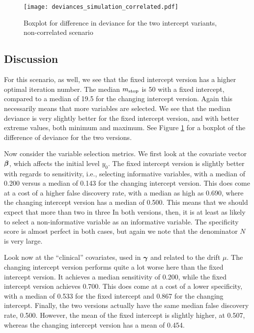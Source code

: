 \begin{figure}
\caption{Boxplot for difference in deviance for the two intercept variants, non-correlated scenario}
\label{fig:simulation-not-correlated-deviances-boxplot}
\centering\texttt{[image: deviances\_simulation\_correlated.pdf]}
\end{figure}


\subsection{Discussion}
For this scenario, as well, we see that the fixed intercept version has a higher optimal iteration number.
The median $m_{\text{stop}}$ is 50 with a fixed intercept, compared to a median of 19.5 for the changing intercept version.
Again this necessarily means that more variables are selected.
We see that the median deviance is very slightly better for the fixed intercept version, and with better extreme values, both minimum and maximum.
See Figure \ref{fig:simulation-not-correlated-deviances-boxplot} for a boxplot of the difference of deviance for the two versions.

Now consider the variable selection metrics.
We first look at the covariate vector $\boldsymbol{\beta}$, which affects the initial level $y_0$.
The fixed intercept version is slightly better with regards to sensitivity, i.e., selecting informative variables, with a median of 0.200 versus a median of 0.143 for the changing intercept version.
This does come at a cost of a higher false discovery rate, with a median as high as 0.690, where the changing intercept version has a median of 0.500.
This means that we should expect that more than two in three 
In both versions, then, it is at least as likely to select a non-informative variable as an informative variable.
The specificity score is almost perfect in both cases, but again we note that the denominator $N$ is very large.

Look now at the ``clinical'' covariates, used in $\boldsymbol{\gamma}$ and related to the drift $\mu$.
The changing intercept version performs quite a lot worse here than the fixed intercept version.
It achieves a median sensitivity of 0.200, while the fixed intercept version achieves 0.700.
This does come at a cost of a lower specificity, with a median of 0.533 for the fixed intercept and 0.867 for the changing intercept.
Finally, the two versions actually have the same median false discovery rate, 0.500.
However, the mean of the fixed intercept is slightly higher, at 0.507, whereas the changing intercept version has a mean of 0.454.

